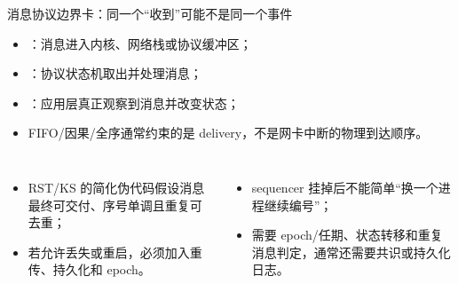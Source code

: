 \documentclass[UTF8,fontset=none,aspectratio=169,10pt]{beamer}
\begin{document}
\partD
\partC
\partB
\partA
\begin{frame}{消息协议边界卡：同一个“收到”可能不是同一个事件}
\small
\begin{itemize}
  \item {}：消息进入内核、网络栈或协议缓冲区；
  \item {}：协议状态机取出并处理消息；
  \item {}：应用层真正观察到消息并改变状态；
  \item FIFO/因果/全序通常约束的是 delivery，不是网卡中断的物理到达顺序。
\end{itemize}
\vfill
\begin{columns}[T,onlytextwidth]
\begin{itemize}
  \item RST/KS 的简化伪代码假设消息最终可交付、序号单调且重复可去重；
  \item 若允许丢失或重启，必须加入重传、持久化和 epoch。
\end{itemize}
\begin{itemize}
  \item sequencer 挂掉后不能简单“换一个进程继续编号”；
  \item 需要 epoch/任期、状态转移和重复消息判定，通常还需要共识或持久化日志。
\end{itemize}
\end{columns}
\vfill
{}
\end{frame}
\end{document}
